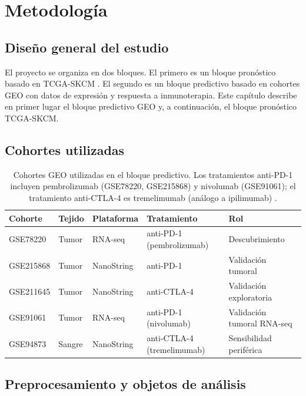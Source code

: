 \chapter{Metodología}

\section{Diseño general del estudio}

El proyecto se organiza en dos bloques. El primero es un bloque pronóstico basado en TCGA-SKCM \cite{TCGA}. El segundo es un bloque predictivo basado en cohortes GEO \cite{GEO} con datos de expresión y respuesta a inmunoterapia. Este capítulo describe en primer lugar el bloque predictivo GEO y, a continuación, el bloque pronóstico TCGA-SKCM.

\section{Cohortes utilizadas}

\begin{table}[H]
\centering
\caption{Cohortes GEO utilizadas en el bloque predictivo. Los tratamientos anti-PD-1 incluyen pembrolizumab \cite{Hamid2013,Robert2014} (GSE78220, GSE215868) y nivolumab \cite{Riaz2017} (GSE91061); el tratamiento anti-CTLA-4 es tremelimumab (análogo a ipilimumab) \cite{Schadendorf2015,Lebbe2014}.}
\label{tab:cohortes_geo}
\begin{tabularx}{\textwidth}{l l l l l}
\toprule
Cohorte & Tejido & Plataforma & Tratamiento & Rol \\
\midrule
GSE78220 \cite{GSE78220,Hugo2016}   & Tumor  & RNA-seq    & anti-PD-1 (pembrolizumab) & Descubrimiento \\
GSE215868 \cite{GSE215868}          & Tumor  & NanoString & anti-PD-1                 & Validación tumoral \\
GSE211645 \cite{GSE211645}          & Tumor  & NanoString & anti-CTLA-4               & Validación exploratoria \\
GSE91061 \cite{GSE91061,Riaz2017}   & Tumor  & RNA-seq    & anti-PD-1 (nivolumab)     & Validación tumoral RNA-seq \\
GSE94873 \cite{GSE94873,Friedlander2017} & Sangre & NanoString & anti-CTLA-4 (tremelimumab) & Sensibilidad periférica \\
\bottomrule
\end{tabularx}
\end{table}

\section{Preprocesamiento y objetos de análisis}


